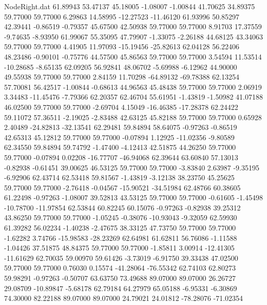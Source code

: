 \begin{filecontents}{NodeRight.dat}
  61.89943   53.47137   45.18005    -1.08007   -1.00844   41.70625   34.89375   59.77000   59.77000    6.29863   14.58995  -12.27523  -11.46120
  61.93996   50.85297   42.39441    -0.86519   -0.79357   45.67500   42.50938   59.77000   59.77000    8.91703   17.37559   -9.74635   -8.93950
  61.99067   55.35095   47.79907    -1.33075   -2.26188   44.68125   43.34063   59.77000   59.77000    4.41905   11.97093  -15.19456  -25.82613
  62.04128   56.22406   48.23486    -0.90101   -0.75776   44.57500   45.86563   59.77000   59.77000    3.54594   11.53514  -10.28685   -8.65135
  62.09205   56.92841   48.06702    -5.69988   -6.12962   44.90000   49.55938   59.77000   59.77000    2.84159   11.70298  -64.89132  -69.78388
  62.13254   57.70081   56.42517    -1.00844   -0.68613   44.96563   45.48438   59.77000   59.77000    2.06919    3.34483  -11.45476   -7.79366
  62.20357   62.46704   55.61951    -1.43819   -1.50982   41.07188   46.02500   59.77000   59.77000   -2.69704    4.15049  -16.46385  -17.28378
  62.24422   59.11072   57.36511    -2.19025   -2.83488   42.63125   45.82188   59.77000   59.77000    0.65928    2.40489  -24.82813  -32.13541
  62.29481   59.84894   58.64075    -0.97263   -0.86519   42.65313   45.12812   59.77000   59.77000   -0.07894    1.12925  -11.02356   -9.80589
  62.34550   59.84894   59.74792    -1.47400   -4.12413   42.51875   44.26250   59.77000   59.77000   -0.07894    0.02208  -16.77707  -46.94068
  62.39644   63.60840   57.13013    -0.82938   -0.61451   39.00625   46.53125   59.77000   59.77000   -3.83840    2.63987   -9.35195   -6.92906
  62.43714   62.53418   59.81567    -1.43819   -3.12138   38.23750   45.25625   59.77000   59.77000   -2.76418   -0.04567  -15.90521  -34.51984
  62.48766   60.38605   61.22498    -0.97263   -1.08007   39.52813   43.53125   59.77000   59.77000   -0.61605   -1.45498  -10.78700  -11.97854
  62.53844   60.82245   60.15076    -0.97263   -0.82938   39.25312   43.86250   59.77000   59.77000   -1.05245   -0.38076  -10.93043   -9.32059
  62.59930   61.39282   56.02234    -1.40238   -2.47675   38.33125   47.73750   59.77000   59.77000   -1.62282    3.74766  -15.98583  -28.23269
  62.64981   61.62811   56.76086    -1.11588   -1.04426   37.51875   48.84375   59.77000   59.77000   -1.85811    3.00914  -12.41305  -11.61629
  62.70035   59.00970   59.61426    -3.73019   -6.91750   39.33438   47.02500   59.77000   59.77000    0.76030    0.15574  -41.28064  -76.55342
  62.74103   62.80273   59.98291    -0.97263   -0.50707   63.63750   73.49688   89.07000   89.07000   26.26727   29.08709  -10.89847   -5.68178
  62.79184   64.27979   65.05188    -6.95331   -6.30869   74.30000   82.22188   89.07000   89.07000   24.79021   24.01812  -78.28076  -71.02354

\end{filecontents}
